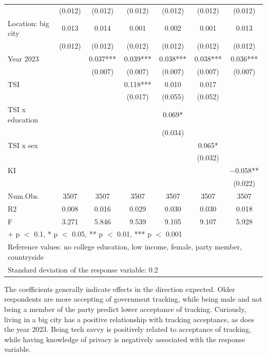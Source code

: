 \documentclass[
  letterpaper,
  DIV=11,
  numbers=noendperiod]{scrartcl}
\begin{document}
\begin{table}
{\begin{tabular}[t]{lcccccc}
 & (\num{0.012}) & (\num{0.012}) & (\num{0.012}) & (\num{0.012}) & (\num{0.012}) & \vphantom{1} (\num{0.012})\\
Location: big city & \num{0.013} & \num{0.014} & \num{0.001} & \num{0.002} & \num{0.001} & \num{0.013}\\
 & (\num{0.012}) & (\num{0.012}) & (\num{0.012}) & (\num{0.012}) & (\num{0.012}) & (\num{0.012})\\
Year 2023 &  & \num{0.037}*** & \num{0.039}*** & \num{0.038}*** & \num{0.038}*** & \num{0.036}***\\
 &  & (\num{0.007}) & (\num{0.007}) & (\num{0.007}) & (\num{0.007}) & (\num{0.007})\\
TSI &  &  & \num{0.118}*** & \num{0.010} & \num{0.017} & \\
 &  &  & (\num{0.017}) & (\num{0.055}) & (\num{0.052}) & \\
TSI x education &  &  &  & \num{0.069}* &  & \\
 &  &  &  & (\num{0.034}) &  & \\
TSI x sex &  &  &  &  & \num{0.065}* & \\
 &  &  &  &  & (\num{0.032}) & \\
KI &  &  &  &  &  & \num{-0.058}**\\
 &  &  &  &  &  & (\num{0.022})\\
\midrule
Num.Obs. & \num{3507} & \num{3507} & \num{3507} & \num{3507} & \num{3507} & \num{3507}\\
R2 & \num{0.008} & \num{0.016} & \num{0.029} & \num{0.030} & \num{0.030} & \num{0.018}\\
F & \num{3.271} & \num{5.846} & \num{9.539} & \num{9.105} & \num{9.107} & \num{5.928}\\
\bottomrule
\multicolumn{7}{l}{\rule{0pt}{1em}+ p $<$ 0.1, * p $<$ 0.05, ** p $<$ 0.01, *** p $<$ 0.001}\\
\multicolumn{7}{l}{\rule{0pt}{1em}Reference values: no college education, low income, female, party member, countryside}\\
\multicolumn{7}{l}{\rule{0pt}{1em}Standard deviation of the response variable:  0.2}\\
\end{tabular}

}

\end{table}%

The coefficients generally indicate effects in the direction expected.
Older respondents are more accepting of government tracking, while being
male and not being a member of the party predict lower acceptance of
tracking. Curiously, living in a big city has a positive relationship
with tracking acceptance, as does the year 2023. Being tech savvy is
positively related to acceptance of tracking, while having knowledge of
privacy is negatively associated with the response variable.
\end{document}
